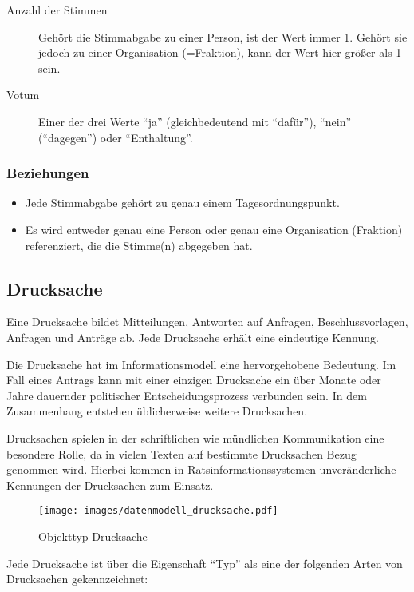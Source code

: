 \documentclass[,a4paper]{article}
\makeatletter
\def\maxwidth{\ifdim\Gin@nat@width>\linewidth\linewidth
\else\Gin@nat@width\fi}
\let\Oldincludegraphics\includegraphics
\renewcommand{\includegraphics}[1]{\Oldincludegraphics[width=\maxwidth]{#1}}
\makeatother
\begin{document}
\begin{description}
\item[Anzahl der Stimmen]
Gehört die Stimmabgabe zu einer Person, ist der Wert immer 1. Gehört sie
jedoch zu einer Organisation (=Fraktion), kann der Wert hier größer als
1 sein.
\item[Votum]
Einer der drei Werte ``ja'' (gleichbedeutend mit ``dafür''), ``nein''
(``dagegen'') oder ``Enthaltung''.
\end{description}

\subsubsection{Beziehungen}

\begin{itemize}
\item
  Jede Stimmabgabe gehört zu genau einem Tagesordnungspunkt.
\item
  Es wird entweder genau eine Person oder genau eine Organisation
  (Fraktion) referenziert, die die Stimme(n) abgegeben hat.
\end{itemize}

\subsection{Drucksache}

Eine Drucksache bildet Mitteilungen, Antworten auf Anfragen,
Beschlussvorlagen, Anfragen und Anträge ab. Jede Drucksache erhält eine
eindeutige Kennung.

Die Drucksache hat im Informationsmodell eine hervorgehobene Bedeutung.
Im Fall eines Antrags kann mit einer einzigen Drucksache ein über Monate
oder Jahre dauernder politischer Entscheidungsprozess verbunden sein. In
dem Zusammenhang entstehen üblicherweise weitere Drucksachen.

Drucksachen spielen in der schriftlichen wie mündlichen Kommunikation
eine besondere Rolle, da in vielen Texten auf bestimmte Drucksachen
Bezug genommen wird. Hierbei kommen in Ratsinformationssystemen
unveränderliche Kennungen der Drucksachen zum Einsatz.

\begin{figure}[htbp]
\centering
\texttt{[image: images/datenmodell\_drucksache.pdf]}
\caption{Objekttyp Drucksache}
\end{figure}

Jede Drucksache ist über die Eigenschaft ``Typ'' als eine der folgenden
Arten von Drucksachen gekennzeichnet:
\end{document}
